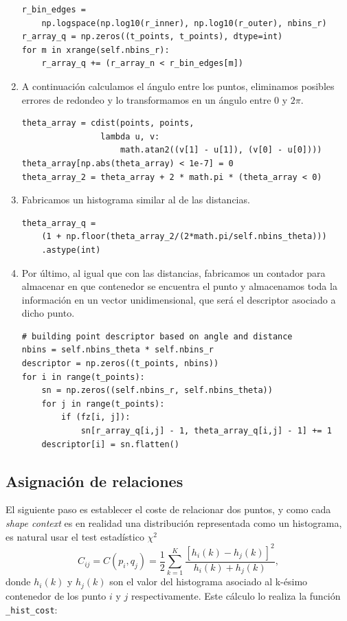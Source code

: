 \documentclass[size=a4, parskip=half, titlepage=false, toc=flat, toc=bib, 12pt]{scrartcl}
\begin{document}
\begin{enumerate}
\begin{verbatim}
r_bin_edges =
    np.logspace(np.log10(r_inner), np.log10(r_outer), nbins_r)
r_array_q = np.zeros((t_points, t_points), dtype=int)
for m in xrange(self.nbins_r):
    r_array_q += (r_array_n < r_bin_edges[m])
\end{verbatim}

\item A continuación calculamos el ángulo entre los puntos, eliminamos posibles errores de redondeo y lo transformamos en un ángulo entre 0 y $2\pi$.
\begin{verbatim}
theta_array = cdist(points, points,
                lambda u, v:
                    math.atan2((v[1] - u[1]), (v[0] - u[0])))
theta_array[np.abs(theta_array) < 1e-7] = 0
theta_array_2 = theta_array + 2 * math.pi * (theta_array < 0)
\end{verbatim}
\item Fabricamos un histograma similar al de las distancias.
\begin{verbatim}
theta_array_q =
    (1 + np.floor(theta_array_2/(2*math.pi/self.nbins_theta)))
    .astype(int)
\end{verbatim}
\item Por último, al igual que con las distancias, fabricamos un contador para almacenar en que contenedor se encuentra el punto y almacenamos toda la información en un vector unidimensional, que será el descriptor asociado a dicho punto.
\begin{verbatim}
# building point descriptor based on angle and distance
nbins = self.nbins_theta * self.nbins_r
descriptor = np.zeros((t_points, nbins))
for i in range(t_points):
    sn = np.zeros((self.nbins_r, self.nbins_theta))
    for j in range(t_points):
        if (fz[i, j]):
            sn[r_array_q[i,j] - 1, theta_array_q[i,j] - 1] += 1
    descriptor[i] = sn.flatten()
\end{verbatim}
\end{enumerate}

\subsection{Asignación de relaciones}%
\label{sub:asignación_de_relaciones}

El siguiente paso es establecer el coste de relacionar dos puntos, y como cada \textit{shape context} es en realidad una distribución representada como un histograma, es natural usar el test estadístico $\chi^2$
\[
C_{ij} = C(p_i,q_j) = \frac{1}{2} \sum_{k=1}^K \frac{[h_i(k) - h_j(k)]^2}{h_i(k) + h_j(k)},
\]
donde $h_i(k)$ y $h_j(k)$ son el valor del histograma asociado al k-ésimo contenedor de los punto $i$ y $j$ respectivamente. Este cálculo lo realiza la función \texttt{\_hist\_cost}:
\end{document}
